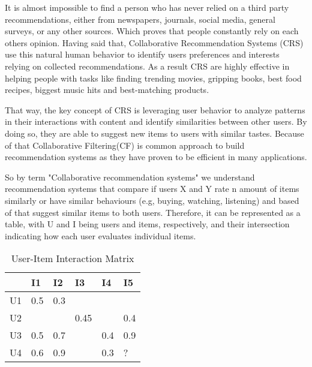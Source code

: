 \documentclass[10pt,a4paper]{article}
\begin{document}
It is almost impossible to find a person who has never relied on a third party recommendations, either from newspapers, journals, social media, general surveys, or any other sources.  Which proves that people constantly rely on each others opinion. Having said that, Collaborative Recommendation Systems (CRS) use this natural human behavior to identify  users preferences and interests relying on collected recommendations. As a result CRS are highly effective in helping people with tasks like finding trending movies, gripping books, best food recipes, biggest music hits and best-matching products.\cite{10.1155/2009/421425}

\hspace{0.2cm}

That way, the key concept of CRS is leveraging user behavior to analyze patterns in their interactions with content and identify similarities between other users. By doing so, they are able to suggest new items to users with similar tastes. Because of that Collaborative Filtering(CF) is common approach to build recommendation systems as they have proven to be efficient in many applications.
\cite{kumar2015role}

\hspace{0.2cm}

So by term "Collaborative recommendation systems" we understand  recommendation systems that compare if users X and Y  rate n amount of items similarly or have similar behaviours (e.g, buying, watching, listening)  and based of that suggest similar items to both users\cite{10.1155/2009/421425}. Therefore, it can be represented as a table, with U and I being users and items, respectively, and their intersection indicating how each user evaluates individual items.

\hspace{0.2cm}

\begin{table}[h]
    \centering
    \begin{tabular}{ |C{1cm}|C{1cm}|C{1cm}|C{1cm}|C{1cm}|C{1cm}| }
    \hline
      & I1 & I2 & I3 & I4 & I5  \\ 
     \hline
     U1 & 0.5 & 0.3 &  &  &  \\  
     \hline
     U2 &  &  & 0.45 &  & 0.4 \\
     \hline
     U3 & 0.5 & 0.7 &  & 0.4 & 0.9 \\
     \hline
     U4 & 0.6 & 0.9 &  & 0.3 & ? \\
     \hline
    \end{tabular}
    \caption{User-Item Interaction Matrix} %
    \label{user-item-table} %
\end{table}
\end{document}
